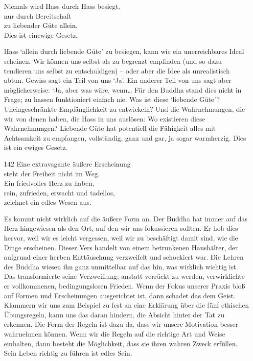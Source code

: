 
\begin{dhpVerse}{5}
\label{dhp-5}
Niemals wird Hass durch Hass besiegt,\\ 
nur durch Bereitschaft\\ 
zu liebender Güte allein.\\ 
Dies ist einewige Gesetz. 
\end{dhpVerse}

\begin{dhpRefl}

Hass `allein durch liebende Güte' zu besiegen, kann wie ein unerreichbares
Ideal scheinen. Wir können uns selbst als zu begrenzt empfinden (und so dazu
tendieren uns selbst zu entschuldigen) -- oder aber die Idee als unrealistisch
abtun. Gewiss sagt ein Teil von uns `Ja'. Ein anderer Teil von uns sagt aber
möglicherweise: `Ja, aber was wäre, wenn… Für den Buddha stand dies nicht in
Frage; zu hassen funktioniert einfach nie. Was ist diese `liebende Güte'?
Uneingeschränkte Empfänglichkeit zu entwickeln? Und die Wahrnehmungen, die wir
von denen haben, die Hass in uns auslösen: Wo existieren diese Wahrnehmungen?
Liebende Güte hat potentiell die Fähigkeit alles mit Achtsamkeit zu empfangen,
vollständig, ganz und gar, ja sogar warmherzig. Dies ist ein ewiges Gesetz.

\end{dhpRefl}


\begin{dhpVerse}{142}
\label{dhp-142}
Eine extravagante äußere Erscheinung\\ 
steht der Freiheit nicht im Weg.\\ 
Ein friedvolles Herz zu haben,\\ 
rein, zufrieden, erwacht und tadellos,\\ 
zeichnet ein edles Wesen aus. 
\end{dhpVerse}

\begin{dhpRefl}

Es kommt nicht wirklich auf die äußere Form an. Der Buddha hat immer auf das
Herz hingewiesen als den Ort, auf den wir uns fokussieren sollten. Er hob dies
hervor, weil wir es leicht vergessen, weil wir zu beschäftigt damit sind, wie
die Dinge erscheinen. Dieser Vers handelt von einem betrunkenen Haushälter,
der aufgrund einer herben Enttäuschung verzweifelt und schockiert war. Die
Lehren des Buddha wiesen ihn ganz unmittelbar auf das hin, was wirklich
wichtig ist. Das transformierte seine Verzweiflung; anstatt verrückt zu
werden, verwirklichte er vollkommenen, bedingungslosen Frieden. Wenn der Fokus
unserer Praxis bloß auf Formen und Erscheinungen ausgerichtet ist, dann
schadet das dem Geist. Klammern wir uns zum Beispiel zu fest an eine Erklärung
über die fünf ethischen Übungsregeln, kann uns das daran hindern, die Absicht
hinter der Tat zu erkennen. Die Form der Regeln ist dazu da, dass wir unsere
Motivation besser wahrnehmen können. Wenn wir die Regeln auf die richtige Art
und Weise einhalten, dann besteht die Möglichkeit, dass sie ihren wahren Zweck
erfüllen. Sein Leben richtig zu führen ist edles Sein.

\end{dhpRefl}

